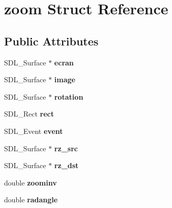 \hypertarget{structzoom}{}\section{zoom Struct Reference}
\label{structzoom}
\subsection*{Public Attributes}
\begin{DoxyCompactItemize}
\item 
S\+D\+L\+\_\+\+Surface $\ast$ {\bfseries ecran}\hypertarget{structzoom_a696047540f7a3c5213ec5869ccab5f77}{}\label{structzoom_a696047540f7a3c5213ec5869ccab5f77}

\item 
S\+D\+L\+\_\+\+Surface $\ast$ {\bfseries image}\hypertarget{structzoom_af56a822c48215a0204e4d2594f28dff3}{}\label{structzoom_af56a822c48215a0204e4d2594f28dff3}

\item 
S\+D\+L\+\_\+\+Surface $\ast$ {\bfseries rotation}\hypertarget{structzoom_a5e044799acc276c7ccd63b30361ec988}{}\label{structzoom_a5e044799acc276c7ccd63b30361ec988}

\item 
S\+D\+L\+\_\+\+Rect {\bfseries rect}\hypertarget{structzoom_a81d02c16f74b0982a08c241942255690}{}\label{structzoom_a81d02c16f74b0982a08c241942255690}

\item 
S\+D\+L\+\_\+\+Event {\bfseries event}\hypertarget{structzoom_a49d4bf65a2544f2410aa1602cba56dc8}{}\label{structzoom_a49d4bf65a2544f2410aa1602cba56dc8}

\item 
S\+D\+L\+\_\+\+Surface $\ast$ {\bfseries rz\+\_\+src}\hypertarget{structzoom_ad1ca2bc2a59ca49ca89a05a7b4659a93}{}\label{structzoom_ad1ca2bc2a59ca49ca89a05a7b4659a93}

\item 
S\+D\+L\+\_\+\+Surface $\ast$ {\bfseries rz\+\_\+dst}\hypertarget{structzoom_a7eed37e30a7a92ee53d0eba1eae7af79}{}\label{structzoom_a7eed37e30a7a92ee53d0eba1eae7af79}

\item 
double {\bfseries zoominv}\hypertarget{structzoom_a640853034d59326cd5faffd1690f3766}{}\label{structzoom_a640853034d59326cd5faffd1690f3766}

\item 
double {\bfseries radangle}\hypertarget{structzoom_af8955163a974485929baae12e2fb0f5a}{}\label{structzoom_af8955163a974485929baae12e2fb0f5a}


\end{DoxyCompactItemize}
